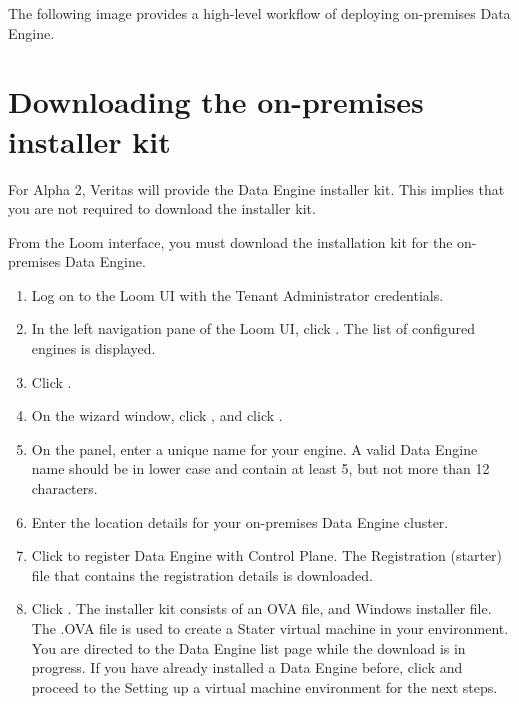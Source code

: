 \documentclass[letterpaper,10pt,english]{sphinxmanual}
\begin{document}
The following image provides a high-level workflow of deploying on-premises Data Engine.

\begin{figure}[htbp]
\centering

\noindent{}
\end{figure}


\chapter{Downloading the on-premises installer kit}
\label{\detokenize{on_prem_dp_install_mcdmp:downloading-the-on-premises-installer-kit}}\label{\detokenize{on_prem_dp_install_mcdmp:download-install-kit}}
For Alpha 2, Veritas will provide the Data Engine installer kit. This implies that you are not required to download the installer kit.

From the Loom interface, you must download the installation kit for the on-premises Data Engine.

\begin{enumerate}
\item {} 
Log on to the Loom UI with the Tenant Administrator credentials.

\item {} 
In the left navigation pane of the Loom UI, click .
The list of configured engines is displayed.

\item {} 
Click .

\item {} 
On the  wizard window, click , and click .

\item {} 
On the  panel, enter a unique name for your engine. A valid Data Engine name should be in lower case and contain at least 5, but not more than 12 characters.

\item {} 
Enter the location details for your on-premises Data Engine cluster.

\item {} 
Click  to register Data Engine with Control Plane. The Registration (starter) file that contains the registration details is downloaded.

\item {} 
Click . The installer kit consists of an OVA file, and Windows installer file. The .OVA file is used to create a Stater virtual machine
in your environment. You are directed to the Data Engine list page while the download is in progress. If you have already installed a Data Engine before,
click  and proceed to the Setting up a virtual machine environment for the next steps.

\end{enumerate}
\end{document}
